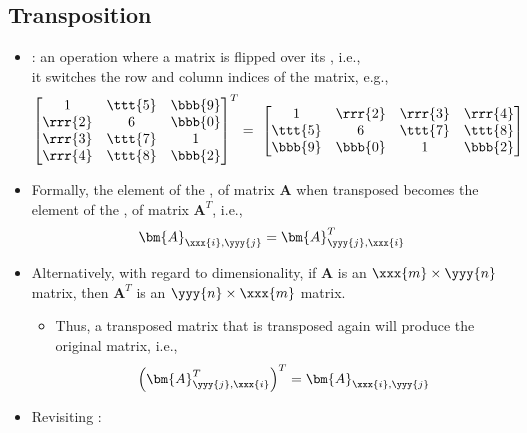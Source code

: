 \begin{itemize}
  \subsection{Transposition}\label{Transposition}
  \begin{itemize}
    \item {}: an operation where a matrix is flipped over its \hyperref[Diagonal]{}, i.e., \\ it switches the row and column indices of the matrix, e.g., 
    \[%
    \begin{bmatrix}
    1 & \ttt{5} & \bbb{9} \\
    \rrr{2} & 6 & \bbb{0} \\
    \rrr{3} & \ttt{7} & 1 \\
    \rrr{4} & \ttt{8} & \bbb{2}
    \end{bmatrix}^T
    = ~
    \begin{bmatrix}
    1 & \rrr{2} & \rrr{3} & \rrr{4} \\
    \ttt{5} & 6 & \ttt{7} & \ttt{8} \\
    \bbb{9} & \bbb{0} & 1 & \bbb{2}
    \end{bmatrix}
    \]%
    \item Formally, the element of the ,  of matrix \(\bm{A}\) when transposed becomes the element of the ,  of matrix \(\bm{A}^T\), i.e.,
    \[%
    \bm{A}_{\xxx{i},\yyy{j}} = \bm{A}_{\yyy{j},\xxx{i}}^T
    \]%
    \item Alternatively, with regard to dimensionality, if \(\bm{A}\) is an \(\xxx{m} \times \yyy{n}\) matrix, then \(\bm{A}^T\) is an \(\yyy{n} \times \xxx{m}\) matrix. 
      \begin{itemize}
        \item Thus, a transposed matrix that is transposed again will produce the original matrix, i.e.,
        \[%
        \left(\bm{A}_{\yyy{j},\xxx{i}}^T\right)^T = \bm{A}_{\xxx{i},\yyy{j}} %
        \]%
      \end{itemize}
    \item Revisiting \hyperref[Augmented and Complex Matrices]{}:
    \begin{itemize}

\end{itemize}
\end{itemize}
\end{itemize}
